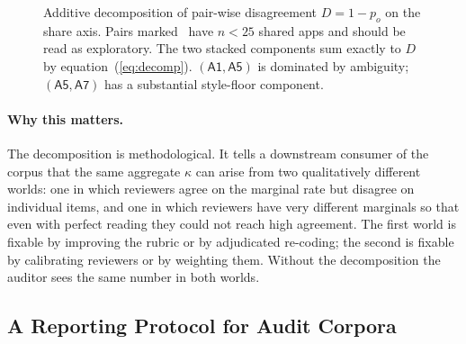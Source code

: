 \documentclass[11pt,a4paper]{article}
\newcommand{\Acc}[1]{\textsf{A#1}}
\begin{document}
\begin{figure}[!htbp]
\centering
{}
\caption{Additive decomposition of pair-wise disagreement $D=1-p_o$
on the share axis. Pairs marked \dag\ have $n<25$ shared apps and
should be read as exploratory. The two stacked components sum
exactly to $D$ by equation~(\ref{eq:decomp}). $(\Acc{1},\Acc{5})$
is dominated by ambiguity; $(\Acc{5},\Acc{7})$ has a substantial
style-floor component.}
\label{fig:kappa-stack}
\end{figure}

\paragraph{Why this matters.}
The decomposition is methodological. It tells a downstream consumer
of the corpus that the same aggregate $\kappa$ can arise from two
qualitatively different worlds: one in which reviewers agree on the
marginal rate but disagree on individual items, and one in which
reviewers have very different marginals so that even with perfect
reading they could not reach high agreement. The first world is
fixable by improving the rubric or by adjudicated re-coding; the
second is fixable by calibrating reviewers or by weighting them.
Without the decomposition the auditor sees the same number in both
worlds.

\subsection{A Reporting Protocol for Audit Corpora}
\label{sec:rak-protocol}
\end{document}
